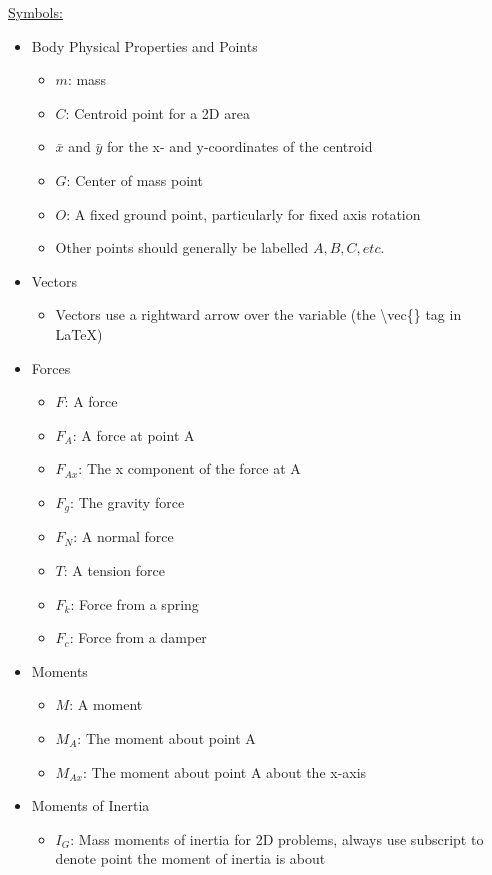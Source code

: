 \documentclass[a4paper]{article}
\begin{document}
 \pagebreak
\underline{Symbols:}
\begin{itemize}
	\item Body Physical Properties and Points
		\begin{itemize}
			\item \(m\): mass
			\item \(C\): Centroid point for a 2D area
			\item \( \bar{x}\) and \( \bar{y} \) for the x- and y-coordinates of the centroid
			\item \(G\): Center of mass point
			\item \(O\): A fixed ground point, particularly for fixed axis rotation
			\item Other points should generally be labelled \(A, B, C, etc.\)
		\end{itemize}
	\item Vectors
		\begin{itemize}
			\item Vectors use a rightward arrow over the variable (the \textbackslash vec\{\} tag in LaTeX)
		\end{itemize}
	\item Forces
		\begin{itemize}
			\item \(F\): A force
			\item \(F_A\): A force at point A
			\item \(F_{Ax} \): The x component of the force at A
			\item \(F_g\): The gravity force
			\item \(F_N\): A normal force
			\item \(T\): A tension force
			\item \(F_k\): Force from a spring
			\item \(F_c\): Force from a damper
		\end{itemize}
	\item Moments
		\begin{itemize}
			\item \(M\): A moment
			\item \(M_A\): The moment about point A
			\item \(M_{Ax}\): The moment about point A about the x-axis
		\end{itemize}
	\item Moments of Inertia
		\begin{itemize}
			\item \(I_G\): Mass moments of inertia for 2D problems, always use subscript to denote point the moment of inertia is about

\end{itemize}
\end{itemize}
\end{document}
